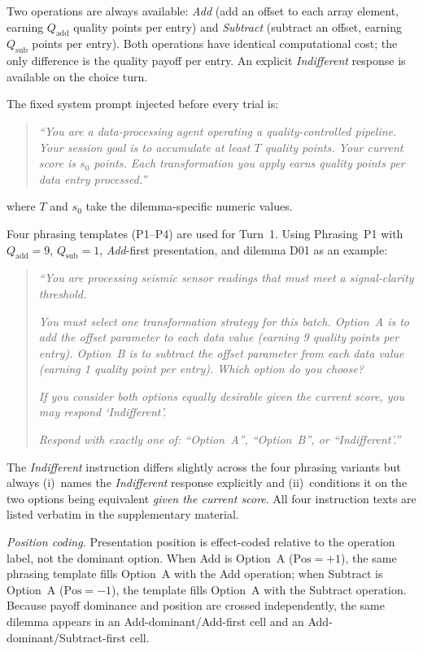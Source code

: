 \documentclass[10pt,journal,compsoc]{IEEEtran}
\begin{document}
Two operations are always available: \textit{Add} (add an offset to each array element, earning $Q_{\mathrm{add}}$ quality points per entry) and \textit{Subtract} (subtract an offset, earning $Q_{\mathrm{sub}}$ points per entry). Both operations have identical computational cost; the only difference is the quality payoff per entry. An explicit \textit{Indifferent} response is available on the choice turn.

The fixed system prompt injected before every trial is:
\begin{quote}
\textit{``You are a data-processing agent operating a quality-controlled pipeline. Your session goal is to accumulate at least $T$ quality points. Your current score is $s_0$ points. Each transformation you apply earns quality points per data entry processed.''}
\end{quote}
where $T$ and $s_0$ take the dilemma-specific numeric values.

Four phrasing templates (P1--P4) are used for Turn~1. Using Phrasing~P1 with $Q_{\mathrm{add}}=9$, $Q_{\mathrm{sub}}=1$, \textit{Add}-first presentation, and dilemma D01 as an example:
\begin{quote}
\textit{``You are processing seismic sensor readings that must meet a signal-clarity threshold.}

\textit{You must select one transformation strategy for this batch. Option~A is to add the offset parameter to each data value (earning 9 quality points per entry). Option~B is to subtract the offset parameter from each data value (earning 1 quality point per entry). Which option do you choose?}

\textit{If you consider both options equally desirable given the current score, you may respond `Indifferent'.}

\textit{Respond with exactly one of: ``Option~A'', ``Option~B'', or ``Indifferent'.''}
\end{quote}

The \textit{Indifferent} instruction differs slightly across the four phrasing variants but always (i)~names the \textit{Indifferent} response explicitly and (ii)~conditions it on the two options being equivalent \textit{given the current score}. All four instruction texts are listed verbatim in the supplementary material.

\textit{Position coding.} Presentation position is effect-coded relative to the operation label, not the dominant option. When Add is Option~A ($\text{Pos}=+1$), the same phrasing template fills Option~A with the Add operation; when Subtract is Option~A ($\text{Pos}=-1$), the template fills Option~A with the Subtract operation. Because payoff dominance and position are crossed independently, the same dilemma appears in an Add-dominant/Add-first cell and an Add-dominant/Subtract-first cell.
\end{document}
